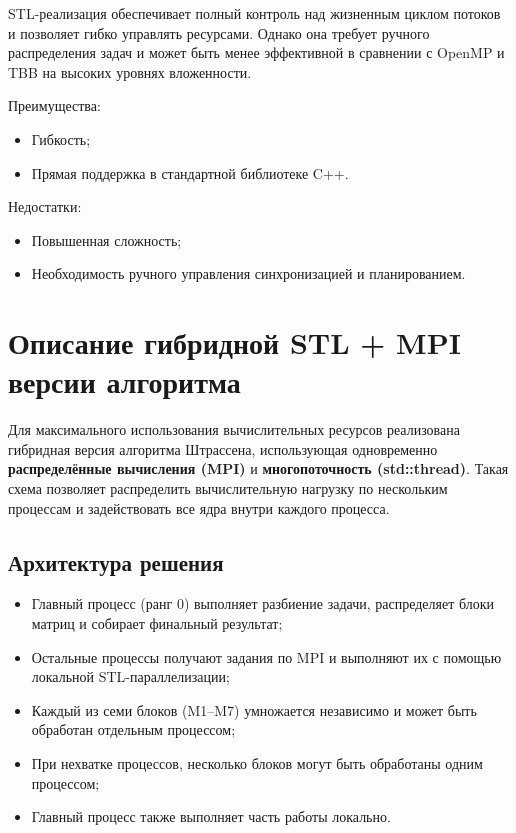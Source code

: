 \documentclass[14pt,a4paper]{extarticle}
\begin{document}
STL-реализация обеспечивает полный контроль над жизненным циклом потоков и позволяет гибко управлять ресурсами. Однако она требует ручного распределения задач и может быть менее эффективной в сравнении с OpenMP и TBB на высоких уровнях вложенности.

Преимущества:
\begin{itemize}
    \item Гибкость;
    \item Прямая поддержка в стандартной библиотеке C++.
\end{itemize}

Недостатки:
\begin{itemize}
    \item Повышенная сложность;
    \item Необходимость ручного управления синхронизацией и планированием.
\end{itemize}


\newpage

\section{Описание гибридной STL + MPI версии алгоритма}

Для максимального использования вычислительных ресурсов реализована гибридная версия алгоритма Штрассена, использующая одновременно \textbf{распределённые вычисления (MPI)} и \textbf{многопоточность (std::thread)}. Такая схема позволяет распределить вычислительную нагрузку по нескольким процессам и задействовать все ядра внутри каждого процесса.

\subsection*{Архитектура решения}

\begin{itemize}
  \item Главный процесс (ранг 0) выполняет разбиение задачи, распределяет блоки матриц и собирает финальный результат;
  \item Остальные процессы получают задания по MPI и выполняют их с помощью локальной STL-параллелизации;
  \item Каждый из семи блоков (M1–M7) умножается независимо и может быть обработан отдельным процессом;
  \item При нехватке процессов, несколько блоков могут быть обработаны одним процессом;
  \item Главный процесс также выполняет часть работы локально.
\end{itemize}
\end{document}
